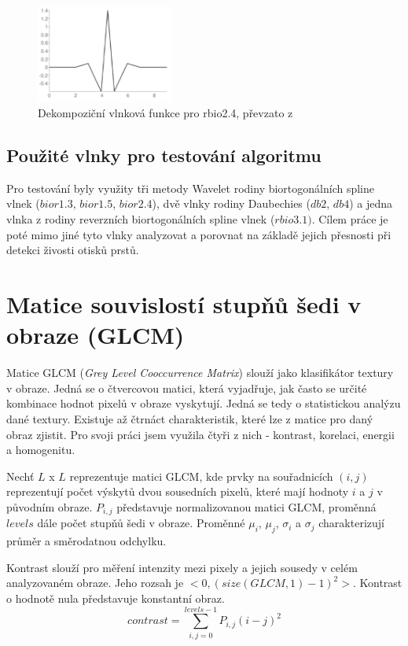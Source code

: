 \begin{figure}[!htbp]
    \centering
    \includegraphics[width=170px]{obrazky-figures/rbio31wavelet.PNG}
    \caption{Dekompoziční vlnková funkce pro rbio2.4, převzato z \cite{PyWaveletsBrowser}}
\end{figure}

\subsection{Použité vlnky pro testování algoritmu}
Pro testování byly využity tři metody Wavelet rodiny biortogonálních spline vlnek ($bior1.3$, $bior1.5$, $bior2.4$), dvě vlnky rodiny Daubechies ($db2$, $db4$) a jedna vlnka z rodiny reverzních biortogonálních spline vlnek ($rbio3.1)$. Cílem práce je poté mimo jiné tyto vlnky analyzovat a porovnat na základě jejich přesnosti při detekci živosti otisků prstů.


\section{Matice souvislostí stupňů šedi v obraze (GLCM)}
Matice GLCM (\textit{Grey Level Cooccurrence Matrix}) slouží jako klasifikátor textury v obraze. Jedná se o čtvercovou matici, která vyjadřuje, jak často se určité kombinace hodnot pixelů v obraze vyskytují. Jedná se tedy o statistickou analýzu dané textury. Existuje až čtrnáct charakteristik, které lze z matice pro daný obraz zjistit. Pro svoji práci jsem využila čtyři z nich - kontrast, korelaci, energii a homogenitu.

Nechť $L$ x $L$ reprezentuje matici GLCM, kde prvky na souřadnicích $(i,j)$ reprezentují počet výskytů dvou sousedních pixelů, které mají hodnoty $i$ a $j$ v původním obraze. $P_{i,j}$ představuje normalizovanou matici GLCM, proměnná $levels$ dále počet stupňů šedi v obraze. Proměnné $\mu_i$, $\mu_j$, $\sigma_i$ a $\sigma_j$ charakterizují průměr a směrodatnou odchylku. \cite{TouchlessANN}

Kontrast slouží pro měření intenzity mezi pixely a jejich sousedy v celém analyzovaném obraze. Jeho rozsah je $<0, (size(GLCM,1)-1)^2>$. Kontrast o hodnotě nula představuje konstantní obraz. \cite{MatlabGLCM} \cite{ScikitGLCM}
$$contrast = \sum_{i,j=0}^{levels-1}P_{i,j}(i-j)^2$$

